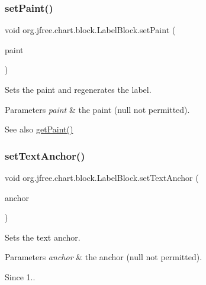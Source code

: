 \subsubsection{\texorpdfstring{set\+Paint()}{setPaint()}}
{\footnotesize\ttfamily void org.\+jfree.\+chart.\+block.\+Label\+Block.\+set\+Paint (\begin{DoxyParamCaption}\item[{Paint}]{paint }\end{DoxyParamCaption})}

Sets the paint and regenerates the label.


\begin{DoxyParams}{Parameters}
{\em paint} & the paint ({\ttfamily null} not permitted).\\
\hline
\end{DoxyParams}
\begin{DoxySeeAlso}{See also}
\mbox{\hyperlink{classorg_1_1jfree_1_1chart_1_1block_1_1_label_block_abb777abf886b16519d0839e4b78ac8ba}{get\+Paint()}} 
\end{DoxySeeAlso}
\mbox{\label{classorg_1_1jfree_1_1chart_1_1block_1_1_label_block_a524c31c631e5cd29792725037c1ddfdf}} 
\subsubsection{\texorpdfstring{set\+Text\+Anchor()}{setTextAnchor()}}
{\footnotesize\ttfamily void org.\+jfree.\+chart.\+block.\+Label\+Block.\+set\+Text\+Anchor (\begin{DoxyParamCaption}\item[{Rectangle\+Anchor}]{anchor }\end{DoxyParamCaption})}

Sets the text anchor.


\begin{DoxyParams}{Parameters}
{\em anchor} & the anchor ({\ttfamily null} not permitted).\\
\hline
\end{DoxyParams}
\begin{DoxySince}{Since}
1.. 
\end{DoxySince}
\mbox{\label{classorg_1_1jfree_1_1chart_1_1block_1_1_label_block_a5246d7e339b69d4a5da629b28118e95e}} 
